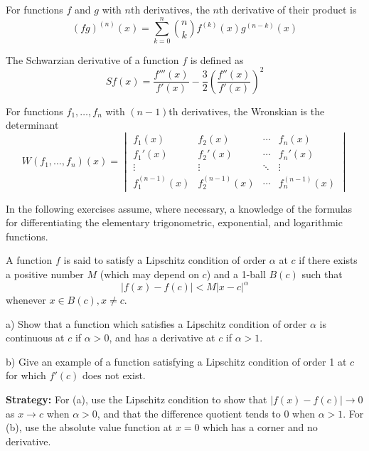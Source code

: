 \begin{theorem}
For functions $f$ and $g$ with $n$th derivatives, the $n$th derivative of their product is
\[ (fg)^{(n)}(x) = \sum_{k=0}^{n} \binom{n}{k} f^{(k)}(x)g^{(n-k)}(x) \]
\end{theorem}

\begin{theorem}
The Schwarzian derivative of a function $f$ is defined as
\[ Sf(x) = \frac{f'''(x)}{f'(x)} - \frac{3}{2}\left(\frac{f''(x)}{f'(x)}\right)^2 \]
\end{theorem}

\begin{theorem}[Wronskian]
For functions $f_1, \ldots, f_n$ with $(n-1)$th derivatives, the Wronskian is the determinant
\[ W(f_1, \ldots, f_n)(x) = \begin{vmatrix}
f_1(x) & f_2(x) & \cdots & f_n(x) \\
f_1'(x) & f_2'(x) & \cdots & f_n'(x) \\
\vdots & \vdots & \ddots & \vdots \\
f_1^{(n-1)}(x) & f_2^{(n-1)}(x) & \cdots & f_n^{(n-1)}(x)
\end{vmatrix} \]
\end{theorem}

In the following exercises assume, where necessary, a knowledge of the formulas for differentiating the elementary trigonometric, exponential, and logarithmic functions.

\begin{problembox}
A function \( f \) is said to satisfy a Lipschitz condition of order \( \alpha \) at \( c \) if there exists a positive number \( M \) (which may depend on \( c \)) and a 1-ball \( B(c) \) such that 
\[ |f(x) - f(c)| < M|x - c|^\alpha \]
whenever \( x \in B(c), x \neq c \).

a) Show that a function which satisfies a Lipschitz condition of order \( \alpha \) is continuous at \( c \) if \( \alpha > 0 \), and has a derivative at \( c \) if \( \alpha > 1 \).

b) Give an example of a function satisfying a Lipschitz condition of order 1 at \( c \) for which \( f'(c) \) does not exist.
\end{problembox}

\noindent\textbf{Strategy:} For (a), use the Lipschitz condition to show that $|f(x) - f(c)| \to 0$ as $x \to c$ when $\alpha > 0$, and that the difference quotient tends to 0 when $\alpha > 1$. For (b), use the absolute value function at $x = 0$ which has a corner and no derivative.


